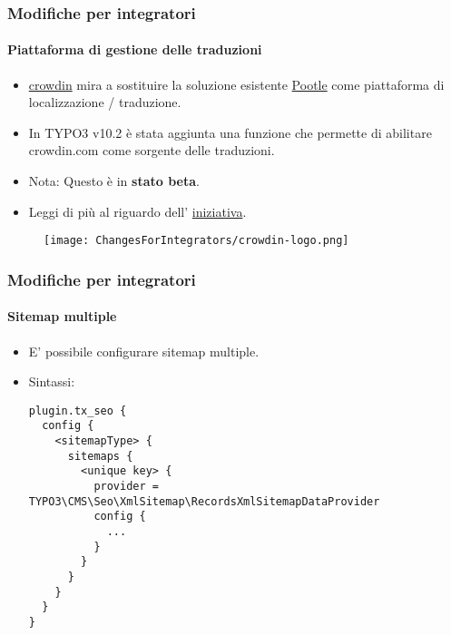 
\begin{frame}[fragile]
	\frametitle{Modifiche per integratori}
	\framesubtitle{Piattaforma di gestione delle traduzioni}

	\begin{itemize}

		\item \href{https://crowdin.com/}{crowdin} mira a sostituire la soluzione esistente
			\href{https://translation.typo3.org/}{Pootle}
			come piattaforma di localizzazione / traduzione.

		\item In TYPO3 v10.2 è stata aggiunta una funzione che permette di abilitare crowdin.com
			come sorgente delle traduzioni.

		\item Nota: Questo è in \textbf{stato beta}.

		\item Leggi di più al riguardo dell'
			\href{https://typo3.org/community/teams/typo3-development/initiatives/localization-with-crowdin/}{iniziativa}.

	\end{itemize}

	\begin{figure}
		\texttt{[image: ChangesForIntegrators/crowdin-logo.png]}
	\end{figure}

\end{frame}


\begin{frame}[fragile]
	\frametitle{Modifiche per integratori}
	\framesubtitle{Sitemap multiple}

	\lstset{basicstyle=\tiny\ttfamily}

	\begin{itemize}

		\item E' possibile configurare sitemap multiple.
		\item Sintassi:
\begin{lstlisting}
plugin.tx_seo {
  config {
    <sitemapType> {
      sitemaps {
        <unique key> {
          provider = TYPO3\CMS\Seo\XmlSitemap\RecordsXmlSitemapDataProvider
          config {
            ...
          }
        }
      }
    }
  }
}
\end{lstlisting}

	\end{itemize}

\end{frame}

